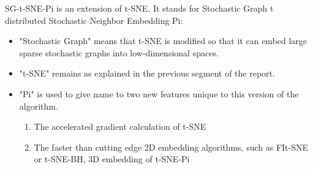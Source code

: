 SG-t-SNE-Pi is an extension of t-SNE. It stands for Stochastic Graph t distributed Stochastic Neighbor 
Embedding Pi:
\begin{itemize} 
    \item "Stochastic Graph" means that t-SNE is modified so that it can embed large sparse stochastic 
    graphs into low-dimensional spaces.
    \item "t-SNE" remains as explained in the previous segment of the report. 
    \item "Pi" is used to give name to two new features unique to this version of the algorithm.
    \begin{enumerate}
        \item The accelerated gradient calculation of t-SNE
        \item The faster than cutting edge 2D embedding algorithms, such as FIt-SNE or t-SNE-BH, 3D 
        embedding of t-SNE-Pi  
    \end{enumerate}
\end{itemize}
\cite{SG-tSNE-Pi}
